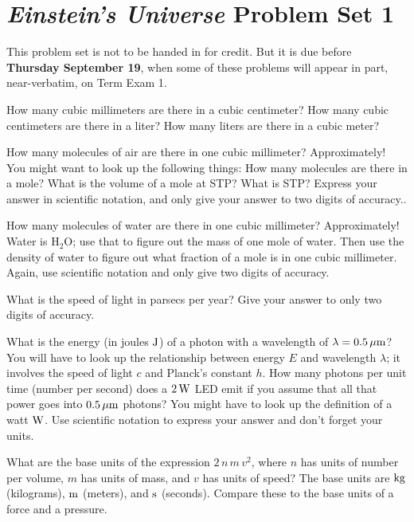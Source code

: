 \documentclass[12pt, letterpaper]{article}
\begin{document}
\section*{\textsl{Einstein's Universe} Problem Set 1}

This problem set is not to be handed in for credit. But it is due
before \textbf{Thursday September 19}, when some of these problems
will appear in part, near-verbatim, on Term Exam 1.

\begin{problem}
How many cubic millimeters are there in a cubic centimeter? How many
cubic centimeters are there in a liter? How many liters are there in a
cubic meter?
\end{problem}

\begin{problem}
How many molecules of air are there in one cubic millimeter?
Approximately! You might want to look up the following things: How
many molecules are there in a mole? What is the volume of a mole at
STP? What is STP? Express your answer in scientific notation, and only
give your answer to two digits of accuracy..
\end{problem}

\begin{problem}
How many molecules of water are there in one cubic millimeter?
Approximately! Water is $\mathrm{H}_2\mathrm{O}$; use that to figure
out the mass of one mole of water. Then use the density of water to
figure out what fraction of a mole is in one cubic millimeter. Again,
use scientific notation and only give two digits of accuracy.
\end{problem}

\begin{problem}
What is the speed of light in parsecs per year? Give your answer to
only two digits of accuracy.
\end{problem}

\begin{problem}
What is the energy (in joules $\mathrm{J}$) of a photon with a wavelength of
$\lambda = 0.5\,\mathrm{\mu m}$? You will have to look up the relationship
between energy $E$ and wavelength $\lambda$; it involves the speed of
light $c$ and Planck's constant $h$. How many photons per unit time
(number per second) does a $2\,\mathrm{W}$ LED emit if you assume that all
that power goes into $0.5\,\mathrm{\mu m}$ photons? You might have to look up
the definition of a watt $\mathrm{W}$. Use scientific notation to express your
answer and don't forget your units.
\end{problem}

\begin{problem}
What are the base units of the expression $2\,n\,m\,v^2$, where $n$
has units of number per volume, $m$ has units of mass, and $v$ has
units of speed? The base units are $\mathrm{kg}$ (kilograms), $\mathrm{m}$ (meters),
and $\mathrm{s}$ (seconds). Compare these to the base units of a force and a
pressure.
\end{problem}
\end{document}
